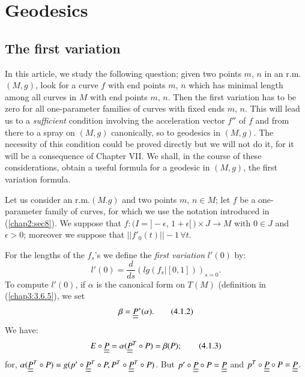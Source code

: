 \chapter{Geodesics}\label{chap4:chap4}

\section{The  first variation}\label{chap4:sec1}\pageoriginale

In this article, we study the 
following question; given two points $m$, $n$ in an r.m.\@ $(M,g)$,
look for a curve $f$ with end points $m$, $n$ which has minimal
length among all curves in $M$ with end points $m$, $n$. Then the
first variation has to be zero for all one-parameter families of
curves with fixed ends $m$, $n$. This will lead us to a {\em
sufficient} condition involving the acceleration vector $f''$ of
$f$ and from there to a spray on $(M,g)$ canonically, so to
geodesics in $(M,g)$. The necessity of this condition could be
proved directly but we will not do it, for it will be a consequence
of Chapter VII. We shall, in the course of these considerations,
obtain a useful formula for a geodesic in $(M,g)$, the first
variation formula.

\quad 
Let us consider an r.m.\@ $(M.g)$ and two points $m$, $n\in M$; let
$f$ be a one-parameter family of curves, for which we use the notation
introduced in (\ref{chap2:sec8}). We suppose that $f:(I=]-\epsilon$,
  $1+\epsilon[\,)\times J\to M$ with $0\in J$ and $\epsilon>0$;
    moreover we suppose that $||f'_{0}(t)||-1 \, \forall t$.

For the lengths of the $f_{s}$'s we define the {\em first variation}
$l'(0)$ by:
\begin{equation*}
l'(0)=\frac{d}{ds}(lg(f_{s}|[0,1]))_{s=0}.\tag{4.1.1}\label{chap4:4.1.1}
\end{equation*}
To compute $l'(0)$, if $\alpha$ is the canonical form on $T(M)$
(definition in (\ref{chap3:3.6.5}), we set
\begin{equation*}
\beta=\underline{\underline{P}}^{\ast}(\alpha).\tag{4.1.2}\label{chap4:4.1.2}
\end{equation*}\pageoriginale 
We have:
\begin{equation*}
E\circ\underline{\underline{P}}=\alpha(\underline{\underline{P}}^{T}\circ P)=\beta(P);\tag{4.1.3}\label{chap4:4.1.3}
\end{equation*}
for, $\alpha(\underline{\underline{P}}^{T}\circ P)=g(p'\circ\underline{\underline{P}}^{T}\circ
P,P^{T}\circ \underline{\underline{P}}^{T}\circ P)$. But $p'\circ\underline{\underline{P}}\circ P=\underline{\underline{P}}$
and $p^{T}\circ \underline{\underline{P}}\circ P=\underline{\underline{P}}$.

